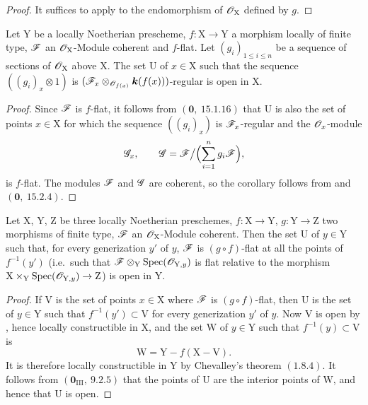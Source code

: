 \begin{proof}
It suffices to apply  to the endomorphism of $\mathscr{O}_\mathrm{X}$ defined by $g$.
\end{proof}

\begin{corollary}[11.1.4]
\label{IV.11.1.4}
Let $\mathrm{Y}$ be a locally Noetherian prescheme, $f:\mathrm{X}\to\mathrm{Y}$ a morphism locally of finite type, $\mathscr{F}$ an $\mathscr{O}_\mathrm{X}$-Module coherent and $f$-flat. Let $(g_i)_{1\leqslant i\leqslant n}$ be a sequence of sections of $\mathscr{O}_\mathrm{X}$ above $\mathrm{X}$. The set $\mathrm{U}$ of $x\in\mathrm{X}$ such that the sequence $((g_i)_x\otimes 1)$ is $(\mathscr{F}_x\otimes_{\mathscr{O}_{f(x)}}\boldsymbol{k}(f(x)))$-regular is open in $\mathrm{X}$.
\end{corollary}

\begin{proof}
Since $\mathscr{F}$ is $f$-flat, it follows from
$(\mathbf{0},~15.1.16)$ that $\mathrm{U}$ is also the set of points
$x\in\mathrm{X}$ for which the sequence $((g_i)_x)$ is
$\mathscr{F}_x$-regular and the $\mathscr{O}_x$-module
\[
  \mathscr{G}_x,\qquad
  \mathscr{G}=\mathscr{F}\big/\Bigl(\sum_{i=1}^n g_i\mathscr{F}\Bigr),
\]
is $f$-flat. The modules $\mathscr{F}$ and $\mathscr{G}$ are coherent, so the
corollary follows from  and
$(\mathbf{0},~15.2.4)$.
\end{proof}

\begin{corollary}[11.1.5]
\label{IV.11.1.5}
Let $\mathrm{X}$, $\mathrm{Y}$, $\mathrm{Z}$ be three locally Noetherian preschemes, $f:\mathrm{X}\to\mathrm{Y}$, $g:\mathrm{Y}\to\mathrm{Z}$ two morphisms of finite type, $\mathscr{F}$ an $\mathscr{O}_\mathrm{X}$-Module coherent. Then the set $\mathrm{U}$ of $y\in\mathrm{Y}$ such that, for every generization $y'$ of $y$, $\mathscr{F}$ is $(g\circ f)$-flat at all the points of $f^{-1}(y')$ (i.e.\ such that $\mathscr{F}\otimes_\mathrm{Y}\operatorname{Spec}(\mathscr{O}_{\mathrm{Y},y})$ is flat relative to the morphism $\mathrm{X}\times_\mathrm{Y}\operatorname{Spec}(\mathscr{O}_{\mathrm{Y},y})\to\mathrm{Z}$) is open in $\mathrm{Y}$.
\end{corollary}

\begin{proof}
If $\mathrm{V}$ is the set of points $x\in\mathrm{X}$ where $\mathscr{F}$ is
$(g\circ f)$-flat, then $\mathrm{U}$ is the set of $y\in\mathrm{Y}$ such
that $f^{-1}(y')\subset\mathrm{V}$ for every generization $y'$ of $y$.
Now $\mathrm{V}$ is open by , hence locally
constructible in $\mathrm{X}$, and the set $\mathrm{W}$ of
$y\in\mathrm{Y}$ such that $f^{-1}(y)\subset\mathrm{V}$ is
\[
  \mathrm{W}=\mathrm{Y}-f(\mathrm{X}-\mathrm{V}).
\]
It is therefore locally constructible in $\mathrm{Y}$ by Chevalley's
theorem $(1.8.4)$. It follows from
$(\mathbf{0}_{\mathrm{III}},~9.2.5)$ that the points of $\mathrm{U}$ are
the interior points of $\mathrm{W}$, and hence that $\mathrm{U}$ is open.
\end{proof}

